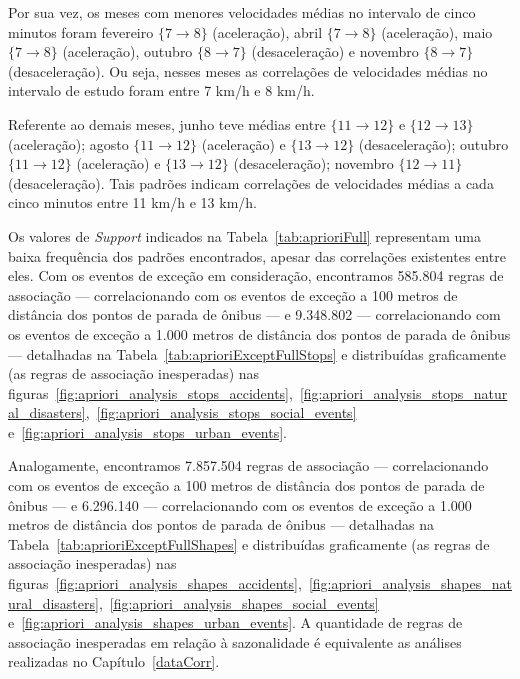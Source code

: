 \documentclass[
	12pt,				%
	oneside,			%
	a4paper,			%
	english,			%
	brazil				%
	]{abntex2ppgsi}
\begin{document}
{{{Por sua vez, os meses com menores velocidades médias no intervalo de cinco minutos foram fevereiro $\lbrace 7 \rightarrow 8\rbrace$ (aceleração), abril $\lbrace 7 \rightarrow 8 \rbrace$ (aceleração), maio $\lbrace7 \rightarrow 8\rbrace$ (aceleração), outubro $\lbrace8 \rightarrow 7\rbrace$ (desaceleração) e novembro $\lbrace8 \rightarrow 7\rbrace$ (desaceleração). Ou seja, nesses meses as correlações de velocidades médias no intervalo de estudo foram entre 7 km/h e 8 km/h.

Referente ao demais meses, junho teve médias entre $\lbrace11 \rightarrow 12\rbrace$ e $\lbrace12 \rightarrow 13\rbrace$ (aceleração); agosto $\lbrace11 \rightarrow 12\rbrace$ (aceleração) e $\lbrace13 \rightarrow 12\rbrace$  (desaceleração); outubro $\lbrace11 \rightarrow 12\rbrace$ (aceleração) e $\lbrace13 \rightarrow 12\rbrace$ (desaceleração); novembro $\lbrace12 \rightarrow 11\rbrace$ (desaceleração). Tais padrões indicam correlações de velocidades médias a cada cinco minutos entre 11 km/h e 13 km/h.

Os valores de \textit{Support} indicados na Tabela~\ref{tab:aprioriFull} representam  uma baixa frequência dos padrões encontrados, apesar das correlações existentes entre eles. Com os eventos de exceção em consideração, encontramos 585.804 regras de associação --- correlacionando com os eventos de exceção a 100 metros de distância dos pontos de parada de ônibus --- e 9.348.802 --- correlacionando com os eventos de exceção a 1.000 metros de distância dos pontos de parada de ônibus --- detalhadas na Tabela~\ref{tab:aprioriExceptFullStops} e distribuídas graficamente (as regras de associação inesperadas) nas figuras~\ref{fig:apriori_analysis_stops_accidents},~\ref{fig:apriori_analysis_stops_natural_disasters},~\ref{fig:apriori_analysis_stops_social_events} e~\ref{fig:apriori_analysis_stops_urban_events}. 

Analogamente, encontramos 7.857.504 regras de associação --- correlacionando com os eventos de exceção a 100 metros de distância dos pontos de parada de ônibus --- e 6.296.140 --- correlacionando com os eventos de exceção a 1.000 metros de distância dos pontos de parada de ônibus --- detalhadas na Tabela~\ref{tab:aprioriExceptFullShapes} e distribuídas graficamente (as regras de associação inesperadas)  nas figuras~\ref{fig:apriori_analysis_shapes_accidents},~\ref{fig:apriori_analysis_shapes_natural_disasters},~\ref{fig:apriori_analysis_shapes_social_events} e~\ref{fig:apriori_analysis_shapes_urban_events}. A quantidade de regras de associação inesperadas em relação à sazonalidade é equivalente as análises realizadas no Capítulo~\ref{dataCorr}. 

}}}
\end{document}
